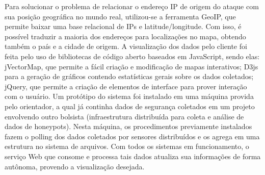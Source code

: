 \documentclass[%
        TwoSidePages,%
        Portuguese,%
        TablesPage,%
        FiguresPage,%
        ]
{ic-tese-v2}
\begin{document}
Para solucionar o problema de relacionar o endereço IP de origem do ataque com sua posição geográfica no mundo real, utilizou-se a ferramenta GeoIP, que permite baixar uma base relacional de IPs e latitude/longitude. Com isso, é possível traduzir a maioria dos endereços para localizações no mapa, obtendo também o país e a cidade de origem.
A visualização dos dados pelo cliente foi feita pelo uso de bibliotecas de código aberto baseados em JavaScript, sendo elas: jVectorMap, que permite a fácil criação e modificação de mapas interativos; D3js para a geração de gráficos contendo estatísticas gerais sobre os dados coletados; jQuery, que permite a criação de elementos de interface para prover interação com o usuário.
Um protótipo do sistema foi instalado em uma máquina provida pelo orientador, a qual já continha dados de segurança coletados em um projeto envolvendo outro bolsista (infraestrutura distribuída para coleta e análise de dados de honeypots). Nesta máquina, os procedimentos previamente instalados fazem o polling dos dados coletados por sensores distribuídos e os agrega em uma estrutura no sistema de arquivos. Com todos os sistemas em funcionamento, o serviço Web que consome e processa tais dados atualiza sua informações de forma autônoma, provendo a visualização desejada.
\end{document}
